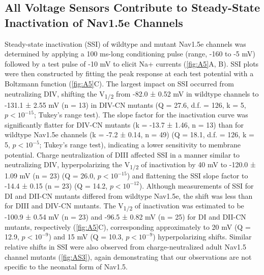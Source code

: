 \subsection{All Voltage Sensors Contribute to Steady-State Inactivation of Nav1.5e Channels}
Steady-state inactivation (SSI) of wildtype and mutant Nav1.5e channels was determined by applying a 100 ms-long conditioning pulse (range, -160 to -5 mV) followed by a test pulse of -10 mV to elicit Na+ currents (\autoref{fig:A5}A, B). SSI plots were then constructed by fitting the peak response at each test potential with a Boltzmann function (\autoref{fig:A5}C). The largest impact on SSI occurred from neutralizing DIV, shifting the V\textsubscript{1/2} from -82.0 ± 0.52 mV in wildtype channels to -131.1 ± 2.55 mV (n = 13) in DIV-CN mutants (Q = 27.6, d.f. = 126, k = 5, $p < 10^{-15}$; Tukey’s range test). The slope factor for the inactivation curve was significantly flatter for DIV-CN mutants (k = -13.7 ± 1.46, n = 13) than for wildtype Nav1.5e channels (k = -7.2 ± 0.14, n = 49) (Q = 18.1, d.f. = 126, k = 5, $p < 10^{-5}$; Tukey’s range test), indicating a lower sensitivity to membrane potential. Charge neutralization of DIII affected SSI in a manner similar to neutralizing DIV, hyperpolarizing the V\textsubscript{1/2} of inactivation by 40 mV to -120.0 ± 1.09 mV (n = 23) (Q = 26.0, $p < 10^{-15}$) and flattening the SSI slope factor to -14.4 ± 0.15 (n = 23) (Q = 14.2, $p < 10^{-12}$). Although measurements of SSI for DI and DII-CN mutants differed from wildtype Nav1.5e, the shift was less than for DIII and DIV-CN mutants. The V\textsubscript{1/2} of inactivation was estimated to be -100.9 ± 0.54 mV (n = 23) and -96.5 ± 0.82 mV (n = 25) for DI and DII-CN mutants, respectively (\autoref{fig:A5}C), corresponding approximately to 20 mV (Q = 12.9, $p < 10^{-9}$) and 15 mV (Q = 10.3, $p < 10^{-9}$) hyperpolarizing shifts. Similar relative shifts in SSI were also observed from charge-neutralized adult Nav1.5 channel mutants (\autoref{fig:AS3}), again demonstrating that our observations are not specific to the neonatal form of Nav1.5.

